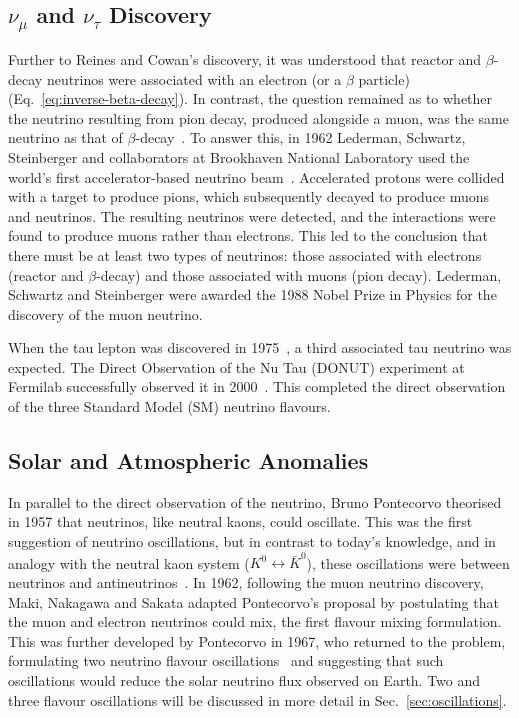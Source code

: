 \subsection{$\nu_{\mu}$ and $\nu_{\tau}$ Discovery}
Further to Reines and Cowan's discovery, it was understood that reactor and $\beta$-decay neutrinos were associated with an electron (or a $\beta$ particle)~\cite{CowanReines1956} (Eq.~\ref{eq:inverse-beta-decay}). 
In contrast, the question remained as to whether the neutrino resulting from pion decay, produced alongside a muon, was the same neutrino as that of $\beta$-decay~\cite{Feinberg1958,Pontecorvo1960}. 
To answer this, in 1962 Lederman, Schwartz, Steinberger and collaborators at Brookhaven National Laboratory used the world's first accelerator-based neutrino beam~\cite{Danby1962}. 
Accelerated protons were collided with a target to produce pions, which subsequently
decayed to produce muons and neutrinos. 
The resulting neutrinos were detected, and the interactions were found to produce muons rather than electrons. 
This led to the conclusion that there must be at least two types of
neutrinos: those associated with electrons (reactor and $\beta$-decay)
and those associated with muons (pion decay).
Lederman, Schwartz and Steinberger were awarded the 1988 Nobel Prize in Physics for the discovery of the muon neutrino.

When the tau lepton was discovered in 1975~\cite{Perl1975}, a third associated tau neutrino was expected. 
The Direct Observation of the Nu Tau (DONUT) experiment at Fermilab successfully observed it in 2000~\cite{Kodama2001}. 
This completed the direct observation of the three Standard Model (SM) neutrino flavours.

\subsection{Solar and Atmospheric Anomalies}
\label{sec:history-anomalies}
In parallel to the direct observation of the neutrino, Bruno Pontecorvo theorised in 1957 that neutrinos, like neutral kaons, could oscillate.
This was the first suggestion of neutrino oscillations, but in contrast to today's knowledge, and in analogy with the neutral kaon system ($K^0\leftrightarrow\bar{K}^0$), these oscillations were between neutrinos and antineutrinos~\cite{Pontecorvo1957,Pontecorvo1958}.
In 1962, following the muon neutrino discovery, Maki, Nakagawa and Sakata adapted Pontecorvo's proposal by postulating that the muon and electron neutrinos could mix, the first flavour mixing formulation.
This was further developed by Pontecorvo in 1967, who returned to the problem, formulating two neutrino flavour oscillations~\cite{MakiNakagawaSakata1962,Pontecorvo1967} and suggesting that such oscillations would reduce the solar neutrino flux observed on Earth.
Two and three flavour oscillations will be discussed in more detail in Sec.~\ref{sec:oscillations}.

